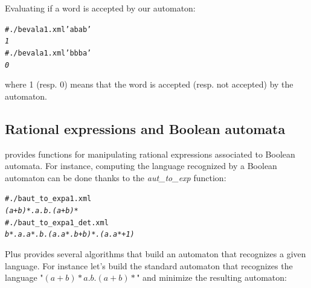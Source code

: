 Evaluating if a word is accepted by our automaton:
\begin{alltt}
# ./b eval a1.xml 'abab'
\textit{1}
# ./b eval a1.xml 'bbba'
\textit{0}
\end{alltt}
where 1 (resp. 0) means that the word is accepted (resp. not accepted)
by the automaton.

\subsection{Rational expressions and Boolean automata}

\Vauc provides functions for manipulating rational expressions
associated to Boolean automata. For instance, computing the language
recognized by a Boolean automaton can be done thanks to the
\textit{aut\_to\_exp} function:
\begin{alltt}
# ./b aut_to_exp a1.xml
\textit{(a+b)*.a.b.(a+b)*}
# ./b aut_to_exp a1_det.xml
\textit{b*.a.a*.b.(a.a*.b+b)*.(a.a*+1)}
\end{alltt}
Plus \Vauc provides several algorithms that build an automaton that
recognizes a given language. For instance let's build the standard
automaton that recognizes the language "$(a+b)*a.b.(a+b)*$" and
minimize the resulting automaton:

